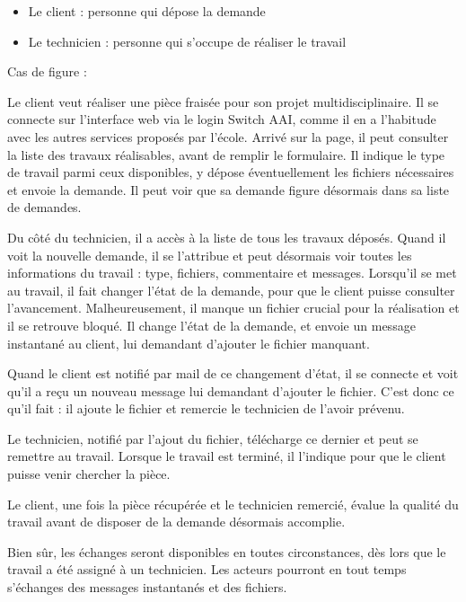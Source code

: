 \documentclass[
    iai, %
    eai, %
]{heig-tb}
\begin{document}
\begin{itemize}
  \item Le client : personne qui dépose la demande
  \item Le technicien : personne qui s'occupe de réaliser le travail
\end{itemize}

Cas de figure :

Le client veut réaliser une pièce fraisée pour son projet multidisciplinaire. Il se connecte sur l'interface web via le login Switch AAI, comme il en a l'habitude avec les autres services proposés par l'école. Arrivé sur la page, il peut consulter la liste des travaux réalisables, avant de remplir le formulaire. Il indique le type de travail parmi ceux disponibles, y dépose éventuellement les fichiers nécessaires et envoie la demande. Il peut voir que sa demande figure désormais dans sa liste de demandes.

Du côté du technicien, il a accès à la liste de tous les travaux déposés. Quand il voit la nouvelle demande, il se l'attribue et peut désormais voir toutes les informations du travail : type, fichiers, commentaire et messages. Lorsqu'il se met au travail, il fait changer l'état de la demande, pour que le client puisse consulter l'avancement.
Malheureusement, il manque un fichier crucial pour la réalisation et il se retrouve bloqué. Il change l'état de la demande, et envoie un message instantané au client, lui demandant d'ajouter le fichier manquant.

Quand le client est notifié par mail de ce changement d'état, il se connecte et voit qu'il a reçu un nouveau message lui demandant d'ajouter le fichier. C'est donc ce qu'il fait : il ajoute le fichier et remercie le technicien de l'avoir prévenu.

Le technicien, notifié par l'ajout du fichier, télécharge ce dernier et peut se remettre au travail. Lorsque le travail est terminé, il l'indique pour que le client puisse venir chercher la pièce.

Le client, une fois la pièce récupérée et le technicien remercié, évalue la qualité du travail avant de disposer de la demande désormais accomplie.


Bien sûr, les échanges seront disponibles en toutes circonstances, dès lors que le travail a été assigné à un technicien. Les acteurs pourront en tout temps s'échanges des messages instantanés et des fichiers.
\end{document}
